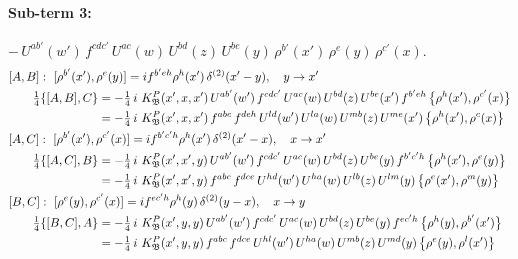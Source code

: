 \documentclass[10pt]{article}
\numberwithin{equation}{section}
\begin{document}
\paragraph{Sub-term 3:} $-\,U^{ab'}(w')\,f^{cdc'}\,U^{ac}(w)\,U^{bd}(z)\,U^{be}(y)\,\rho^{b'}(x')\,\rho^{e}(y)\,\rho^{c'}(x)$.
\begin{align}
&[A,B]:\ [\rho^{b'}(x'),\rho^{e}(y)]=i f^{b'eh}\rho^{h}(x')\,\delta^{(2)}(x'-y),\quad y\to x'\notag\\
&\qquad \tfrac14\{[A,B],C\}=-\tfrac14\,i\,\,K^{P}_{\mathfrak B}(x',x,x')\,U^{ab'}(w')\,f^{cdc'}\,U^{ac}(w)\,U^{bd}(z)\,U^{be}(x')\,f^{b'eh}\,\big\{\rho^{h}(x'),\rho^{c'}(x)\big\}\notag\\
&\qquad\phantom{\tfrac14\{[A,B],C\}}=-\tfrac14\,i\,\,K^{P}_{\mathfrak B}(x',x,x')\,f^{abc}\,f^{deh}\,U^{ld}(w')\,U^{la}(w)\,U^{mb}(z)\,U^{me}(x')\,\big\{\rho^{h}(x'),\rho^{c}(x)\big\}
\label{B:eq:GI.IV.P-3-AB}\\
&[A,C]:\ [\rho^{b'}(x'),\rho^{c'}(x)]=i f^{b'c'h}\rho^{h}(x')\,\delta^{(2)}(x'-x),\quad x\to x'\notag\\
&\qquad \tfrac14\{[A,C],B\}=-\tfrac14\,i\,\,K^{P}_{\mathfrak B}(x',x',y)\,U^{ab'}(w')\,f^{cdc'}\,U^{ac}(w)\,U^{bd}(z)\,U^{be}(y)\,f^{b'c'h}\,\big\{\rho^{h}(x'),\rho^{e}(y)\big\}\notag\\
&\qquad\phantom{\tfrac14\{[A,C],B\}}=-\tfrac14\,i\,\,K^{P}_{\mathfrak B}(x',x',y)\,f^{abc}\,f^{dce}\,U^{hd}(w')\,U^{ha}(w)\,U^{lb}(z)\,U^{lm}(y)\,\big\{\rho^{e}(x'),\rho^{m}(y)\big\}
\label{B:eq:GI.IV.P-3-AC}\\
&[B,C]:\ [\rho^{e}(y),\rho^{c'}(x)]=i f^{ec'h}\rho^{h}(y)\,\delta^{(2)}(y-x),\quad x\to y\notag\\
&\qquad \tfrac14\{[B,C],A\}=-\tfrac14\,i\,\,K^{P}_{\mathfrak B}(x',y,y)\,U^{ab'}(w')\,f^{cdc'}\,U^{ac}(w)\,U^{bd}(z)\,U^{be}(y)\,f^{ec'h}\,\big\{\rho^{h}(y),\rho^{b'}(x')\big\}\notag\\
&\qquad\phantom{\tfrac14\{[B,C],A\}}=-\tfrac14\,i\,\,K^{P}_{\mathfrak B}(x',y,y)\,f^{abc}\,f^{dce}\,U^{hl}(w')\,U^{ha}(w)\,U^{mb}(z)\,U^{md}(y)\,\big\{\rho^{e}(y),\rho^{l}(x')\big\}
\label{B:eq:GI.IV.P-3-BC}
\end{align}
\end{document}
